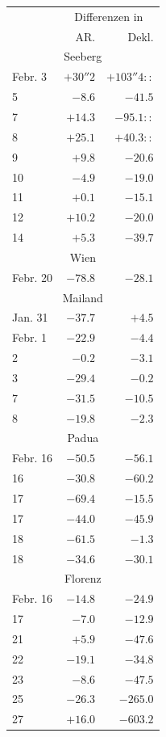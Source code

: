 \begin{center}
\begin{tabular}{l|r|r}
& \multicolumn{2}{c}{Differenzen in} \\
& AR. & Dekl. \\
\multicolumn{3}{c}{Seeberg} \\
Febr. 3 & $+30''2$ & $+103''4\!::$ \\
5 & $-8.6$ & $-41.5$ \\
7 & $+14.3$ & $-95.1\!::$ \\
8 & $+25.1$ & $+40.3\!::$ \\
9 & $+9.8$ & $-20.6$ \\
10 & $-4.9$ & $-19.0$ \\
11 & $+0.1$ & $-15.1$ \\
12 & $+10.2$ & $-20.0$ \\
14 & $+5.3$ & $-39.7$ \\
\multicolumn{3}{c}{Wien} \\
Febr. 20 & $-78.8$ & $-28.1$ \\
\multicolumn{3}{c}{Mailand} \\
Jan. 31 & $-37.7$ & $+4.5$ \\
Febr. 1 & $-22.9$ & $-4.4$ \\
2 & $-0.2$ & $-3.1$ \\
3 & $-29.4$ & $-0.2$ \\
7 & $-31.5$ & $-10.5$ \\
8 & $-19.8$ & $-2.3$ \\
\multicolumn{3}{c}{Padua} \\
Febr. 16 & $-50.5$ & $-56.1$ \\
16 & $-30.8$ & $-60.2$ \\
17 & $-69.4$ & $-15.5$ \\
17 & $-44.0$ & $-45.9$ \\
18 & $-61.5$ & $-1.3$ \\
18 & $-34.6$ & $-30.1$ \\
\multicolumn{3}{c}{Florenz} \\
Febr. 16 & $-14.8$ & $-24.9$ \\
17 & $-7.0$ & $-12.9$ \\
21 & $+5.9$ & $-47.6$ \\
22 & $-19.1$ & $-34.8$ \\
23 & $-8.6$ & $-47.5$ \\
25 & $-26.3$ & $-265.0$ \\
27 & $+16.0$ & $-603.2$ \\
\end{tabular}
\end{center}
